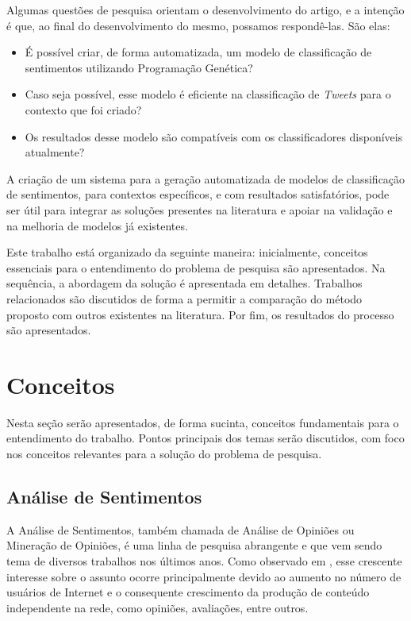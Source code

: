 \documentclass[12pt]{article}
\begin{document}
Algumas questões de pesquisa orientam o desenvolvimento do artigo, e a intenção é que, ao final do desenvolvimento do mesmo, possamos respondê-las. São elas:

\begin{itemize}
	\item{É possível criar, de forma automatizada, um modelo de classificação de sentimentos utilizando Programação Genética?}
	\item{Caso seja possível, esse modelo é eficiente na classificação de \emph{Tweets} para o contexto que foi criado?}
	\item{Os resultados desse modelo são compatíveis com os classificadores disponíveis atualmente?}
\end{itemize}


A criação de um sistema para a geração automatizada de modelos de classificação de sentimentos, para contextos específicos, e com resultados satisfatórios, pode ser útil para integrar as soluções presentes na literatura e apoiar na validação e na melhoria de modelos já existentes.

Este trabalho está organizado da seguinte maneira: inicialmente, conceitos essenciais para o entendimento do problema de pesquisa são apresentados. Na sequência, a abordagem da solução é apresentada em detalhes. Trabalhos relacionados são discutidos de forma a permitir a comparação do método proposto com outros existentes na literatura. Por fim, os resultados do processo são apresentados.

\section{Conceitos}

Nesta seção serão apresentados, de forma sucinta, conceitos fundamentais para o entendimento do trabalho. Pontos principais dos temas serão discutidos, com foco nos conceitos relevantes para a solução do problema de pesquisa.

\subsection{Análise de Sentimentos}
A Análise de Sentimentos, também chamada de Análise de Opiniões ou Mineração de Opiniões, é uma linha de pesquisa abrangente e que vem sendo tema de diversos trabalhos nos últimos anos. Como observado em \cite{liu2010multifaceted}, esse crescente interesse sobre o assunto ocorre principalmente devido ao aumento no número de usuários de Internet e o consequente crescimento da produção de conteúdo independente na rede, como opiniões, avaliações, entre outros. 
\end{document}
